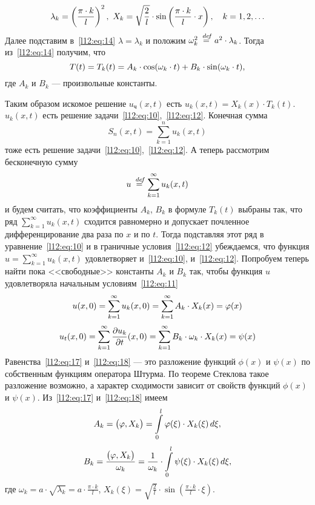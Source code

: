 \documentclass[12pt,a4paper,openany,fleqn]{book}
\newcommand {\defeq}{\stackrel{\hspace{0.09 cm}de\!f}{=}}
\newcommand {\eqdef}{\defeq}
\newcommand{\pder}[2]{\ensuremath{\frac{\partial#1}{\partial#2}}}
\theoremstyle{definition}
\begin{document}
\begin{equation*}
	\hfill\lambda_k=\left(\frac{\pi\cdot k}{l}\right)^2,\ X_k=\sqrt{\frac{2}{l}}\cdot\sin\left(\frac{\pi\cdot k}{l}\cdot x\right),\quad k=1,2,\ldots\hfill
\end{equation*}
Далее подставим в~\eqref{l12:eq:14} $\lambda=\lambda_k$ и положим $\omega^2_k\eqdef a^2\cdot\lambda_k$. Тогда из~\eqref{l12:eq:14} получим, что 
\begin{equation*}
	\hfill T(t)=T_k(t)=A_k\cdot\cos(\omega_k\cdot t)+B_k\cdot\sin(\omega_k\cdot t),\hfill
\end{equation*}
где $A_k$ и $B_k$ --- произвольные константы. 

Таким образом искомое решение $u_{\text{ч}}(x,t)$ есть $u_k(x,t)=X_k(x)\cdot T_k(t)$. $u_k(x,t)$ есть решение задачи~\eqref{l12:eq:10},~\eqref{l12:eq:12}. Конечная сумма 
\begin{equation*}
	S_n(x,t)=\sum\limits_{k=1}^n u_k(x,t) 
\end{equation*}
тоже есть решение задачи~\eqref{l12:eq:10},~\eqref{l12:eq:12}. А теперь рассмотрим бесконечную сумму 
\begin{equation*}
	u\eqdef\sum\limits_{k=1}^{\infty}u_k(x,t)
\end{equation*}
и будем считать, что коэффициенты $A_k$, $B_k$ в формуле $T_k(t)$ выбраны так, что ряд $\sum\limits_{k=1}^{\infty}u_k(x,t)$ сходится равномерно и допускает почленное дифференцирование два раза по $x$ и по $t$. Тогда подставляя этот ряд в уравнение~\eqref{l12:eq:10} и в граничные условия~\eqref{l12:eq:12} убеждаемся, что функция $u=\sum\limits_{k=1}^{\infty}u_k(x,t)$ удовлетворяет и~\eqref{l12:eq:10}, и~\eqref{l12:eq:12}. Попробуем теперь найти пока <<свободные>> константы $A_k$ и $B_k$ так, чтобы функция $u$ удовлетворяла начальным условиям~\eqref{l12:eq:11}
\begin{equation}
	\label{l12:eq:17}
	\hfill u(x,0)=\sum\limits_{k=1}^{\infty}u_k(x,0)=\sum\limits_{k=1}^{\infty}A_k\cdot X_k(x)=\phi(x)\hfill
\end{equation}
\vspace{-0,8cm}
\begin{equation}
	\label{l12:eq:18}
	\hfill u_t(x,0)=\sum\limits_{k=1}^{\infty}\pder{u_k}{t}(x,0)=\sum\limits_{k=1}^{\infty}B_k\cdot\omega_k\cdot X_k(x)=\psi(x)\hfill
\end{equation}
Равенства~\eqref{l12:eq:17} и~\eqref{l12:eq:18} --- это разложение функций $\phi(x)$ и $\psi(x)$ по собственным функциям оператора Штурма. По теореме Стеклова такое разложение возможно, а характер сходимости зависит от свойств функций $\phi(x)$ и $\psi(x)$. Из~\eqref{l12:eq:17} и~\eqref{l12:eq:18} имеем 
\begin{equation*}
	\hfill A_k=\big(\phi,X_k\big)=\int\limits_0^l\phi(\xi)\cdot X_k(\xi)\,d\xi,\hfill
\end{equation*}
\vspace{-0,8cm}
\begin{equation*}
	\hfill B_k=\frac{\big(\phi,X_k\big)}{\omega_k}=\frac{1}{\omega_k}\cdot\int\limits_0^l\psi(\xi)\cdot X_k(\xi)\,d\xi,\hfill
\end{equation*}
где $\omega_k=a\cdot\sqrt{\lambda_k}=a\cdot\frac{\pi\cdot k}{l}$, $X_k(\xi)=\sqrt{\frac{2}{l}}\cdot\sin\left(\frac{\pi\cdot k}{l}\cdot\xi\right)$.
\end{document}
